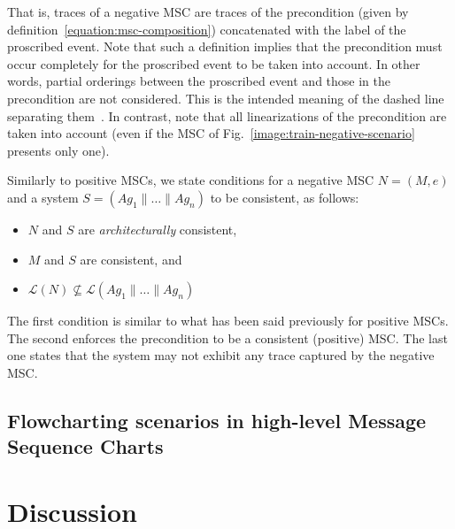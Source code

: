 That is, traces of a negative MSC are traces of the precondition (given by definition~\ref{equation:msc-composition}) concatenated with the label of the proscribed event. Note that such a definition implies that the precondition must occur completely for the proscribed event to be taken into account. In other words, partial orderings between the proscribed event and those in the precondition are not considered. This is the intended meaning of the dashed line separating them~\cite{Uchitel:2004}. In contrast, note that all linearizations of the precondition are taken into account (even if the MSC of Fig.~\ref{image:train-negative-scenario} presents only one). 

Similarly to positive MSCs, we state conditions for a negative MSC $N = (M,e)$ and a system $S = (Ag_1 \parallel \ldots \parallel Ag_n)$ to be consistent, as follows:

\begin{itemize}
\item $N$ and $S$ are \emph{architecturally} consistent,
\item $M$ and $S$ are consistent, and
\item $\mathcal{L}(N) \not\subseteq \mathcal{L}(Ag_1 \parallel \ldots \parallel Ag_n)$
\end{itemize}

The first condition is similar to what has been said previously for positive MSCs. The second enforces the precondition to be a consistent (positive) MSC. The last one states that the system may not exhibit any trace captured by the negative MSC.

\subsection[Flowcharting scenarios in high-level MSCs]{Flowcharting scenarios in high-level Message Sequence Charts}

\section{Discussion\label{section:background-discussion}}
